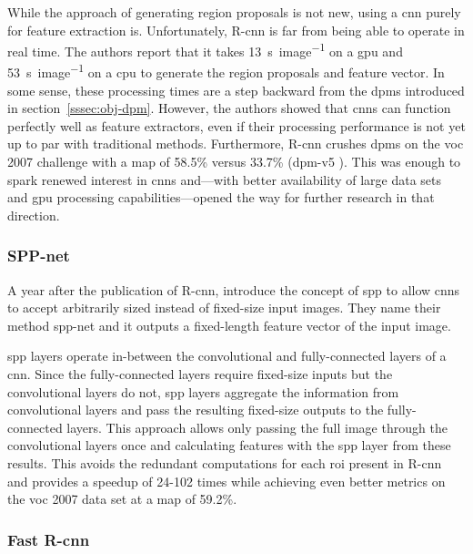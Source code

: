 \documentclass[draft,final]{vutinfth} %
\begin{document}
While the approach of generating region proposals is not new, using a
\gls{cnn} purely for feature extraction is. Unfortunately, R-\gls{cnn}
is far from being able to operate in real time. The authors report
that it takes \qty{13}{\s\per image} on a \gls{gpu} and
\qty{53}{\s\per image} on a \gls{cpu} to generate the region proposals
and feature vector. In some sense, these processing times are a step
backward from the \glspl{dpm} introduced in
section~\ref{sssec:obj-dpm}. However, the authors showed that
\glspl{cnn} can function perfectly well as feature extractors, even if
their processing performance is not yet up to par with traditional
methods. Furthermore, R-\gls{cnn} crushes \glspl{dpm} on the \gls{voc}
2007 challenge with a \gls{map} of 58.5\% \cite{girshick2014} versus
33.7\% (\gls{dpm}-v5 \cite{girshick,felzenszwalb2010}). This was
enough to spark renewed interest in \glspl{cnn} and—with better
availability of large data sets and \gls{gpu} processing
capabilities—opened the way for further research in that direction.

\subsubsection{SPP-net}
\label{sssec:theory-spp-net}

A year after the publication of R-\gls{cnn}, \textcite{he2015}
introduce the concept of \gls{spp} to allow \glspl{cnn} to accept
arbitrarily sized instead of fixed-size input images. They name their
method \gls{spp}-net and it outputs a fixed-length feature vector of
the input image.

\gls{spp} layers operate in-between the convolutional and
fully-connected layers of a \gls{cnn}. Since the fully-connected
layers require fixed-size inputs but the convolutional layers do not,
\gls{spp} layers aggregate the information from convolutional layers
and pass the resulting fixed-size outputs to the fully-connected
layers. This approach allows only passing the full image through the
convolutional layers once and calculating features with the \gls{spp}
layer from these results. This avoids the redundant computations for
each \gls{roi} present in R-\gls{cnn} and provides a speedup of 24-102
times while achieving even better metrics on the \gls{voc} 2007 data
set at a \gls{map} of 59.2\%.

\subsubsection{Fast R-\gls{cnn}}
\label{sssec:theory-fast-rcnn}
\end{document}
